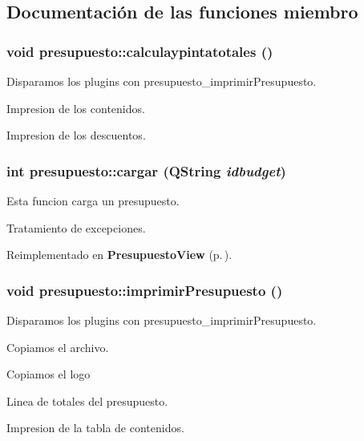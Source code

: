 \subsection{Documentaci\'{o}n de las funciones miembro}
\subsubsection{\setlength{\rightskip}{0pt plus 5cm}void presupuesto::calculaypintatotales ()\hspace{0.3cm}{\tt  [virtual]}}\label{classpresupuesto_a4}


Disparamos los plugins con presupuesto\_\-imprimir\-Presupuesto.

Impresion de los contenidos.

Impresion de los descuentos. 
\subsubsection{\setlength{\rightskip}{0pt plus 5cm}int presupuesto::cargar (QString {\em idbudget})\hspace{0.3cm}{\tt  [virtual]}}\label{classpresupuesto_a5}


Esta funcion carga un presupuesto. 

Tratamiento de excepciones. 

Reimplementado en {\bf Presupuesto\-View} {\rm (p.\,\pageref{classPresupuestoView_a1})}.
\subsubsection{\setlength{\rightskip}{0pt plus 5cm}void presupuesto::imprimir\-Presupuesto ()\hspace{0.3cm}{\tt  [virtual]}}\label{classpresupuesto_a17}


Disparamos los plugins con presupuesto\_\-imprimir\-Presupuesto.

Copiamos el archivo.

Copiamos el logo

Linea de totales del presupuesto.

Impresion de la tabla de contenidos.

